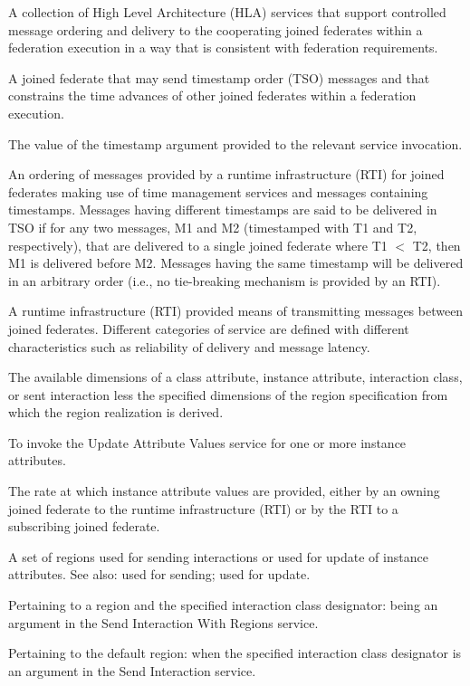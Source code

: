  A collection of High Level Architecture (HLA) services that support controlled message ordering and delivery to the cooperating joined federates within a federation execution in a way that is consistent with federation requirements.

 A joined federate that may send timestamp order (TSO) messages and that constrains the time advances of other joined federates within a federation execution.

 The value of the timestamp argument provided to the relevant service invocation.

\clearpage
{} An ordering of messages provided by a runtime infrastructure (RTI) for joined federates making use of time management services and messages containing timestamps. Messages having different timestamps are said to be delivered in TSO if for any two messages, M1 and M2 (timestamped with T1 and T2, respectively), that are delivered to a single joined federate where T1 $<$ T2, then M1 is delivered before M2. Messages having the same timestamp will be delivered in an arbitrary order (i.e., no tie-breaking mechanism is provided by an RTI).

 A runtime infrastructure (RTI) provided means of transmitting messages between joined federates. Different categories of service are defined with different characteristics such as reliability of delivery and message latency.

 The available dimensions of a class attribute, instance attribute, interaction class, or sent interaction less the specified dimensions of the region specification from which the region realization is derived.

 To invoke the Update Attribute Values service for one or more instance attributes.

 The rate at which instance attribute values are provided, either by an owning joined federate to the runtime infrastructure (RTI) or by the RTI to a subscribing joined federate.

 A set of regions used for sending interactions or used for update of instance attributes. See also: used for sending; used for update.

\begin{stdalphalist}
    \item Pertaining to a region and the specified interaction class designator: being an argument in the Send Interaction With Regions service.
    \item Pertaining to the default region: when the specified interaction class designator is an argument in the Send Interaction service.
\end{stdalphalist}

